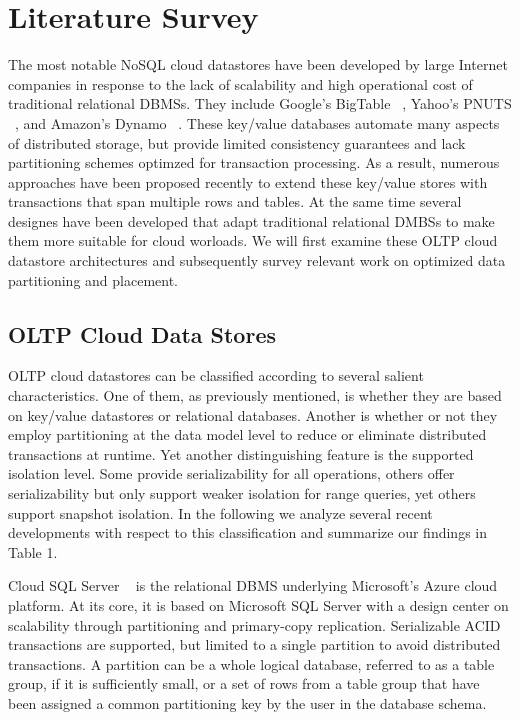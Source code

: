 \documentclass[10pt,final,journal]{IEEEtran}
\begin{document}
\section{Literature Survey}
The most notable NoSQL cloud datastores have been developed by large Internet companies in response to the lack of scalability and high operational cost of traditional relational DBMSs. They include Google's BigTable ~\cite{Chang:2006:BDS:1267308.1267323}, Yahoo's PNUTS ~\cite{Cooper:2008:PYH:1454159.1454167}, and Amazon's Dynamo ~\cite{DeCandia:2007:DAH:1323293.1294281}. These key/value databases automate many aspects of distributed storage, but provide limited consistency guarantees and lack partitioning schemes optimzed for transaction processing. As a result, numerous approaches have been proposed recently  to extend these key/value stores with transactions that span multiple rows and tables. At the same time several designes have been developed that adapt traditional relational DMBSs to make them more suitable for cloud worloads. We will first examine these OLTP cloud datastore architectures and subsequently survey relevant work on optimized data partitioning and placement.

\subsection{OLTP Cloud Data Stores}
OLTP cloud datastores can be classified according to several salient characteristics. One of them, as previously mentioned, is whether they are based on key/value datastores or relational databases. Another is whether or not they employ partitioning at the data model level to reduce or eliminate distributed transactions at runtime. Yet another distinguishing feature is the supported isolation level. Some provide serializability for all operations, others offer serializability but only support weaker isolation for range queries, yet others support snapshot isolation. In the following we analyze several recent developments with respect to this classification and summarize our findings in Table 1.

Cloud SQL Server ~\cite{Campbell:2010:ESF:1807167.1807280, Bernstein:2011:AMS:2004686.2005651} is the relational DBMS underlying Microsoft's Azure cloud platform. At its core, it is based on Microsoft SQL Server with a design center on scalability through partitioning and primary-copy replication. Serializable ACID transactions are supported, but limited to a single partition to avoid distributed transactions. A partition can be a whole logical database, referred to as a table group, if it is sufficiently small, or a set of rows from a table group that have been assigned a common partitioning key by the user in the database schema.
\end{document}
